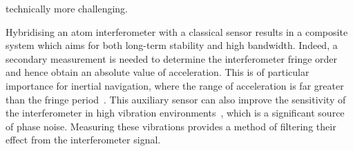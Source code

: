 technically more challenging. 
\par\noindent
Hybridising an atom interferometer with a classical
sensor results in a composite system which aims for both long-term
stability and high bandwidth. Indeed, a secondary
measurement is needed to determine the interferometer fringe order and hence obtain
an absolute value of acceleration. This is of particular importance
for inertial navigation, where the range of acceleration is far
greater than the fringe period~\cite{Merlet2009}. This auxiliary sensor can also
improve the sensitivity of the interferometer in high vibration
environments~\cite{Lautier2014}, which is a significant source of phase
noise. Measuring these vibrations provides a method of filtering their
effect from the interferometer signal. 
